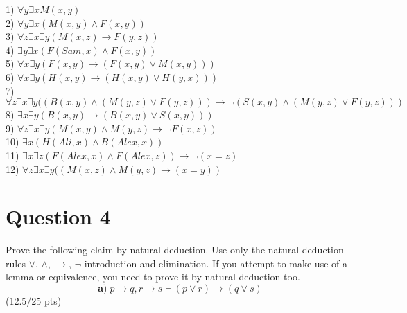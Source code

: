 \documentclass[a4paper,12pt]{article}
\newcommand\tab[1][1cm]{\hspace*{#1}}
\begin{document}
\begin{tcolorbox}

    1)\hspace{2pt} $\forall y \exists x M(x,y)$ \\
    2)\hspace{2pt} $\forall y \exists x (M(x,y) \land F(x,y))$ \\
    3)\hspace{2pt} $\forall z \exists x\exists y(M(x,z) \rightarrow F(y,z))$\\
    4)\hspace{2pt} $\exists y\exists x(F(Sam, x) \land F(x,y))$\\
    5)\hspace{2pt} $\forall x\exists y(F(x,y) \rightarrow (F(x,y)\lor M(x,y)))$\\
    6)\hspace{2pt} $\forall x \exists y (H(x,y)\rightarrow (H(x,y)\lor H(y,x)))$\\
    7)\hspace{2pt} $\forall z \exists x\exists y ((B(x,y)\land(M(y,z)\lor F(y,z)))\rightarrow \lnot(S(x,y)\land (M(y,z)\lor F(y,z)))$\\
    8)\hspace{2pt} $\exists x\exists y (B(x,y) \rightarrow (B(x,y) \lor S(x,y)))$\\
    9)\hspace{2pt} $\forall z\exists x\exists y (M(x,y)\land M(y,z) \rightarrow \lnot F(x,z))$\\
    10)\hspace{2pt} $\exists x (H(Ali, x)\land B(Alex,x))$\\
    11)\hspace{2pt} $\exists x\exists z (F(Alex,x)\land F(Alex,z))\rightarrow \lnot(x=z)$\\
    12)\hspace{2pt} $\forall z\exists x\exists y ((M(x,z)\land M(y,z) \rightarrow (x=y))$

\end{tcolorbox}


\newpage
\section*{Question 4 \hfill {}}
\tab Prove the following claim by natural deduction. Use only the natural deduction rules $\vee$, $\wedge$, $\rightarrow$, $\neg$ introduction and elimination. If you attempt to make use of a lemma or equivalence, you need to prove it by natural deduction too.
\begin{equation*}
    \textbf{a)} \; p \rightarrow q, r \rightarrow s \vdash (p \vee r) \rightarrow (q \vee s)
\end{equation*}
\hfill \small{(12.5/25 pts)}\\
\end{document}
